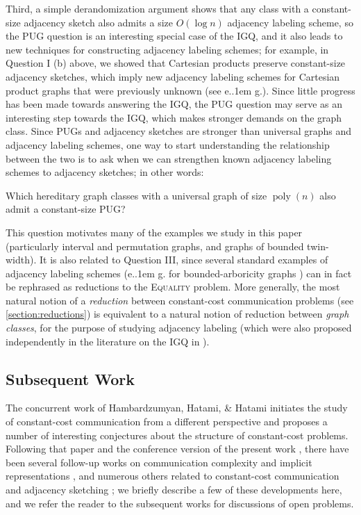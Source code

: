 \documentclass{theoretics}
\makeatletter
\DeclareMathOperator{\poly}{poly}
\newcommand*\eg{e.\kern.1em g.\@\xspace} %
\makeatother
\begin{document}
Third, a simple derandomization argument shows that any class with a constant-size adjacency sketch
also admits a size $O(\log n)$ adjacency labeling scheme, so the PUG question is an interesting
special case of the IGQ, and it also leads to new techniques for constructing adjacency labeling
schemes; for example, in Question I (b) above, we showed that Cartesian products preserve
constant-size adjacency sketches, which imply new adjacency labeling schemes for Cartesian product
graphs that were previously unknown (see \eg \cite{CLR20}). Since little progress has been made
towards answering the IGQ, the PUG question may serve as an interesting step towards the IGQ, which
makes stronger demands on the graph class.  Since PUGs and adjacency sketches are stronger than
universal graphs and adjacency labeling schemes, one way to start understanding the
relationship between the two is to ask when we can strengthen known adjacency labeling
schemes to adjacency sketches; in other words:
\begin{question}
\label{question:igq-to-pug}
Which hereditary graph classes with a universal graph of size $\poly(n)$ also admit a
constant-size PUG?
\end{question}
This question motivates many of the examples we study in this paper (particularly
interval and permutation graphs, and graphs of bounded twin-width). It is also related to
Question III, since several standard examples of adjacency labeling schemes (\eg for
bounded-arboricity graphs \cite{KNR92}) can in fact be rephrased as reductions to the
\textsc{Equality} problem. More generally, the most natural notion of a \emph{reduction}
between constant-cost communication problems (see \cref{section:reductions}) is equivalent to a natural notion of
reduction between \emph{graph classes}, for the purpose of studying adjacency labeling (which were
also proposed independently in the literature on the IGQ in \cite{Chan23}).


\subsection{Subsequent Work} 
\label{section:discussion}

The concurrent work of Hambardzumyan, Hatami, \& Hatami \cite{HHH23dimfree} initiates the study of
constant-cost communication from a different perspective and proposes a number of interesting
conjectures about the structure of constant-cost problems. Following that paper and the conference
version of the present work \cite{HWZ22}, there have been several follow-up works on communication
complexity and implicit representations \cite{HHH22counter, EHK22, EHZ23, HZ23}, and numerous others
related to constant-cost communication \cite{HHPTZ22,ACHS23,CHHS23,HHM23,FHHH24,FGHH24} and
adjacency sketching \cite{NP24}; we briefly describe a few of these developments here, and we refer
the reader to the subsequent works for discussions of open problems.
\end{document}
